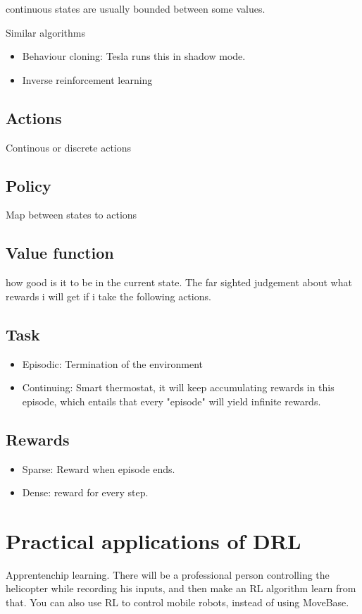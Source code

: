 \documentclass[a4paper]{article}
\begin{document}
continuous states are usually bounded between some values. 

Similar algorithms
\begin{itemize}
	\item Behaviour cloning: Tesla runs this in shadow mode. 
	\item Inverse reinforcement learning
\end{itemize}

\subsection{Actions}
Continous or discrete actions 

\subsection{Policy}
Map between states to actions

\subsection{Value function}
how good is it to be in the current state. The far sighted judgement about what rewards i will get if i take the following actions.


\subsection{Task}
\begin{itemize}
	\item Episodic: Termination of the environment
	\item Continuing: Smart thermostat, it will keep accumulating rewards in this episode, which entails that every "episode" will yield infinite rewards. 
\end{itemize}


\subsection{Rewards}
\begin{itemize}
	\item Sparse: Reward when episode ends.
	\item Dense: reward for every step.
\end{itemize}



\section{Practical applications of DRL}
Apprentenchip learning. There will be a professional person controlling the helicopter while recording his inputs, and then make an RL algorithm learn from that. You can also use RL to control mobile robots, instead of using MoveBase. 
\end{document}

